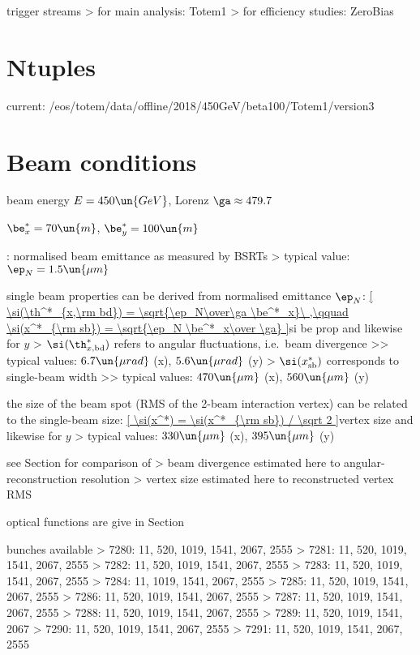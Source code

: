 \> trigger streams
\>> for main analysis: Totem1
\>> for efficiency studies: ZeroBias



\chapter[ntuples]{Ntuples}

\> current: /eos/totem/data/offline/2018/450GeV/beta100/Totem1/version3



\chapter[beam-cond]{Beam conditions}

\> beam energy $E = 450\un{GeV}$, Lorenz $\ga \approx 479.7$

\> $\be^*_x = 70\un{m}$, $\be^*_y = 100\un{m}$

\> : normalised beam emittance as measured by BSRTs
\>> typical value: $\ep_N = 1.5\un{\mu m}$

\> single beam properties can be derived from normalised emittance $\ep_N$:
\eqref{
\si(\th^*_{x,\rm bd}) = \sqrt{\ep_N\over\ga \be^*_x}\ ,\qquad \si(x^*_{\rm sb}) = \sqrt{\ep_N \be^*_x\over \ga}
}{si be prop}
and likewise for $y$
\>> $\si(\th^*_{x,\rm bd})$ refers to angular fluctuations, i.e.~beam divergence
\>>> typical values: $6.7\un{\mu rad}$ (x), $5.6\un{\mu rad}$ (y)
\>> $\si(x^*_{\rm sb})$ corresponds to single-beam width
\>>> typical values: $470\un{\mu m}$ (x), $560\un{\mu m}$ (y)

\> the size of the beam spot (RMS of the 2-beam interaction vertex) can be related to the single-beam size:
\eqref{
\si(x^*) = \si(x^*_{\rm sb}) / \sqrt 2
}{vertex size}
and likewise for $y$
\>> typical values: $330\un{\mu m}$ (x), $395\un{\mu m}$ (y)

\> see Section  for comparison of
\>> beam divergence estimated here to angular-reconstruction resolution
\>> vertex size estimated here to reconstructed vertex RMS

\> optical functions are give in Section 

\> bunches available
\>> 7280: 11, 520, 1019, 1541, 2067, 2555
\>> 7281: 11, 520, 1019, 1541, 2067, 2555
\>> 7282: 11, 520, 1019, 1541, 2067, 2555
\>> 7283: 11, 520, 1019, 1541, 2067, 2555
\>> 7284: 11, 1019, 1541, 2067, 2555
\>> 7285: 11, 520, 1019, 1541, 2067, 2555
\>> 7286: 11, 520, 1019, 1541, 2067, 2555
\>> 7287: 11, 520, 1019, 1541, 2067, 2555
\>> 7288: 11, 520, 1019, 1541, 2067, 2555
\>> 7289: 11, 520, 1019, 1541, 2067
\>> 7290: 11, 520, 1019, 1541, 2067, 2555
\>> 7291: 11, 520, 1019, 1541, 2067, 2555



